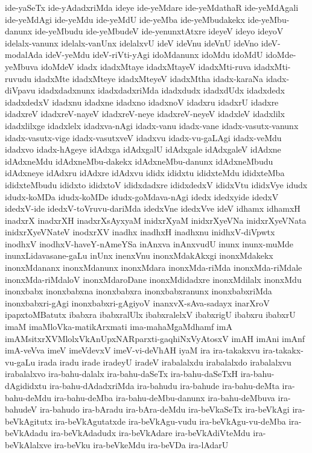{ide-yaSeTx
ide-yAdadxriMda
ideye
ide-yeMdare
ide-yeMdathaR
ide-yeMdAgali
ide-yeMdAgi
ide-yeMdu
ide-yeMdU
ide-yeMba
ide-yeMbudakekx
ide-yeMbu-danunx
ide-yeMbudu
ide-yeMbudeV
ide-yenunxtAtxre
ideyeV
ideyo
ideyoV
idelalx-vanunx
idelalx-vanUnx
idelalxvU
ideV
ideVnu
ideVnU
ideVno
ideV-modalAda
ideV-yeMdu
ideV-riVti-yAgi
idoMdanunx
idoMdu
idoMdU
idoMde-yeMbuva
idoMdeV
idadx
idadxMtaye
idadxMtayeV
idadxMti-ruva
idadxMti-ruvudu
idadxMte
idadxMteye
idadxMteyeV
idadxMtha
idadx-karaNa
idadx-diVpavu
idadxdadxnunx
idadxdadxriMda
idadxdudx
idadxdUdx
idadxdedx
idadxdedxV
idadxnu
idadxne
idadxno
idadxnoV
idadxru
idadxrU
idadxre
idadxreV
idadxreV-nayeV
idadxreV-neye
idadxreV-neyeV
idadxleV
idadxlilx
idadxlilxge
idadxlelx
idadxva-nAgi
idadx-vanu
idadx-vane
idadx-vasutx-vanunx
idadx-vasutx-vige
idadx-vasutxveV
idadxvu
idadx-vu-gaLAgi
idadx-veMdu
idadxvo
idadx-hAgeye
idAdxga
idAdxgalU
idAdxgale
idAdxgaleV
idAdxne
idAdxneMdu
idAdxneMbu-dakekx
idAdxneMbu-danunx
idAdxneMbudu
idAdxneye
idAdxru
idAdxre
idAdxvu
ididx
ididxtu
ididxteMdu
ididxteMba
ididxteMbudu
ididxto
ididxtoV
ididxdadxre
ididxdedxV
ididxVtu
ididxVye
idudx
idudx-koMDa
idudx-koMDe
idudx-goMdava-nAgi
idedx
idedxyide
idedxV
idedxV-ide
idedxV-toVruvu-dariMda
idedxVne
idedxVve
ideV
idhamx
idhamxH
inadxrX
inadxrXH
inadxrXsAyxyaM
inidxrXyaM
inidxrXyeVNa
inidxrXyeVNata
inidxrXyeVNateV
inodxrXV
inadhx
inadhxH
inadhxnu
inidhxV-diVpwtx
inodhxV
inodhxV-haveY-nAmeYSa
inAnxva
inAnxvudU
inunx
inunx-muMde
inunxLidavasane-gaLu
inUnx
inenxVnu
inonxMdakAkxgi
inonxMdakekx
inonxMdananx
inonxMdanunx
inonxMdara
inonxMda-riMda
inonxMda-riMdale
inonxMda-riMdaloV
inonxMdaroDane
inonxMdidadxre
inonxMdilalx
inonxMdu
inonxbabx
inonxbabxna
inonxbabxra
inonxbabxranunx
inonxbabxriMda
inonxbabxri-gAgi
inonxbabxri-gAgiyoV
inanxvX-sAva-sadayx
inarXroV
ipapxtoMBatutx
ibabxra
ibabxralUlx
ibabxralelxV
ibabxrigU
ibabxru
ibabxrU
imaM
imaMloVka-matikArxmati
ima-mahaMgaMdhamf
imA
imAMsitxrXVMlolxVkAnUpxNARparxti-gaqhiNxVyAtosxV
imAH
imAni
imAnf
imA-veVva
imeV
imeVdevxV
imeV-vi-deVhAH
iyaM
ira
ira-takakxvu
ira-takakx-vu-gaLu
irada
iradu
irade
iradeyU
iradeV
irabalalxdu
irabalalxdo
irabalalxvu
irabalalxvo
ira-bahu-dalalx
ira-bahu-daSeTx
ira-bahu-daSeTxH
ira-bahu-dAgididxtu
ira-bahu-dAdadxriMda
ira-bahudu
ira-bahude
ira-bahu-deMta
ira-bahu-deMdu
ira-bahu-deMba
ira-bahu-deMbu-danunx
ira-bahu-deMbuva
ira-bahudeV
ira-bahudo
ira-bAradu
ira-bAra-deMdu
ira-beVkaSeTx
ira-beVkAgi
ira-beVkAgitutx
ira-beVkAgutatxde
ira-beVkAgu-vudu
ira-beVkAgu-vu-deMba
ira-beVkAdadu
ira-beVkAdadudx
ira-beVkAdare
ira-beVkAdiVteMdu
ira-beVkAlalxve
ira-beVku
ira-beVkeMdu
ira-beVDa
ira-lAdarU
}
